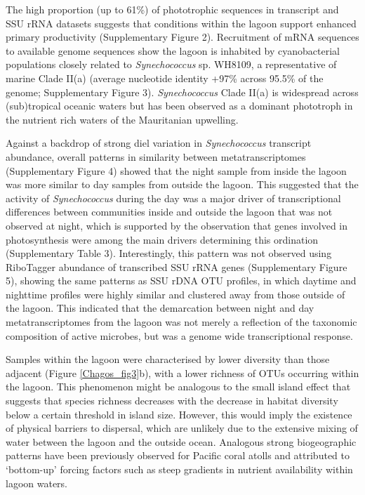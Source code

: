 The high proportion (up to 61\%) of phototrophic sequences in transcript and SSU rRNA datasets suggests that conditions within the lagoon support enhanced primary productivity (Supplementary Figure 2). Recruitment of mRNA sequences to available genome sequences show the lagoon is inhabited by cyanobacterial populations closely related to {\em Synechococcus} sp. WH8109, a representative of marine Clade II(a) (average nucleotide identity +97\% across 95.5\% of the genome; Supplementary Figure 3). {\em Synechococcus} Clade II(a) is widespread across (sub)tropical oceanic waters \cite{mazard2012dissecting, huang_novel_2012} but has been observed as a dominant phototroph in the nutrient rich waters of the Mauritanian upwelling. \cite{zwirglmaier_basin-scale_2007}

Against a backdrop of strong diel variation in {\em Synechococcus} transcript abundance, overall patterns in similarity between metatranscriptomes (Supplementary Figure 4) showed that the night sample from inside the lagoon was more similar to day samples from outside the lagoon. This suggested that the activity of {\em Synechococcus} during the day was a major driver of transcriptional differences between communities inside and outside the lagoon that was not observed at night, which is supported by the observation that genes involved in photosynthesis were among the main drivers determining this ordination (Supplementary Table 3). Interestingly, this pattern was not observed using RiboTagger abundance of transcribed SSU rRNA genes (Supplementary Figure 5), showing the same patterns as SSU rDNA OTU profiles, in which daytime and nighttime profiles were highly similar and clustered away from those outside of the lagoon. This indicated that the demarcation between night and day metatranscriptomes from the lagoon was not merely a reflection of the taxonomic composition of active microbes, but was a genome wide transcriptional response.

Samples within the lagoon were characterised by lower diversity than those adjacent (Figure \ref{Chagos_fig3}b), with a lower richness of OTUs occurring within the lagoon. This phenomenon might be analogous to the small island effect \cite{macarthur1967theory} that suggests that species richness decreases with the decrease in habitat diversity below a certain threshold in island size. However, this would imply the existence of physical barriers to dispersal, which are unlikely due to the extensive mixing of water between the lagoon and the outside ocean. Analogous strong biogeographic patterns have been previously observed for Pacific coral atolls and attributed to ‘bottom-up’ forcing factors such as steep gradients in nutrient availability within lagoon waters. \cite{charpy_picophytoplankton_1999}


